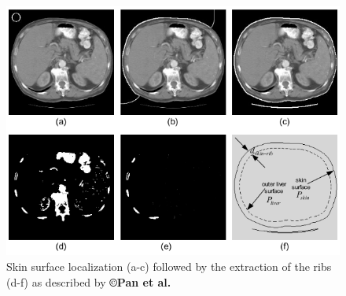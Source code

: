 \begin{figure}[ht!]
	\centering
	\includegraphics[width=0.7\linewidth]{images/Pan2001_Fig5}
	\caption{Skin surface localization (a-c) followed by the extraction of the ribs (d-f) as described by \textbf{©Pan et al. \cite{Pan2001}}}
	\label{Pan2001_Fig5}
\end{figure}


